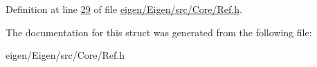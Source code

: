 Definition at line \hyperlink{eigen_2_eigen_2src_2_core_2_ref_8h_source_l00029}{29} of file \hyperlink{eigen_2_eigen_2src_2_core_2_ref_8h_source}{eigen/\+Eigen/src/\+Core/\+Ref.\+h}.



The documentation for this struct was generated from the following file\+:\begin{DoxyCompactItemize}
\item 
eigen/\+Eigen/src/\+Core/\+Ref.\+h\end{DoxyCompactItemize}
